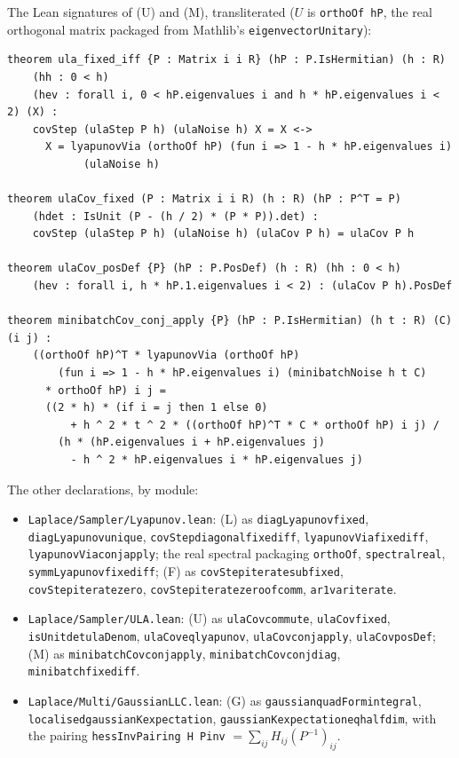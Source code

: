 \documentclass[11pt]{article}
\newcommand{\code}[1]{{\def\_{\textunderscore\allowbreak}\texttt{#1}}}
\begin{document}
\noindent The Lean signatures of (U) and (M), transliterated
($U$ is \code{orthoOf hP}, the real orthogonal matrix packaged from
Mathlib's \code{eigenvectorUnitary}):
{\small
\begin{verbatim}
theorem ula_fixed_iff {P : Matrix i i R} (hP : P.IsHermitian) (h : R)
    (hh : 0 < h)
    (hev : forall i, 0 < hP.eigenvalues i and h * hP.eigenvalues i < 2) (X) :
    covStep (ulaStep P h) (ulaNoise h) X = X <->
      X = lyapunovVia (orthoOf hP) (fun i => 1 - h * hP.eigenvalues i)
            (ulaNoise h)

theorem ulaCov_fixed (P : Matrix i i R) (h : R) (hP : P^T = P)
    (hdet : IsUnit (P - (h / 2) * (P * P)).det) :
    covStep (ulaStep P h) (ulaNoise h) (ulaCov P h) = ulaCov P h

theorem ulaCov_posDef {P} (hP : P.PosDef) (h : R) (hh : 0 < h)
    (hev : forall i, h * hP.1.eigenvalues i < 2) : (ulaCov P h).PosDef

theorem minibatchCov_conj_apply {P} (hP : P.IsHermitian) (h t : R) (C) (i j) :
    ((orthoOf hP)^T * lyapunovVia (orthoOf hP)
        (fun i => 1 - h * hP.eigenvalues i) (minibatchNoise h t C)
      * orthoOf hP) i j =
      ((2 * h) * (if i = j then 1 else 0)
          + h ^ 2 * t ^ 2 * ((orthoOf hP)^T * C * orthoOf hP) i j) /
        (h * (hP.eigenvalues i + hP.eigenvalues j)
          - h ^ 2 * hP.eigenvalues i * hP.eigenvalues j)
\end{verbatim}}
The other declarations, by module:
\begin{itemize}\raggedright
\item \code{Laplace/Sampler/Lyapunov.lean}: (L) as \code{diagLyapunov\_fixed},
\code{diagLyapunov\_unique}, \code{covStep\_diagonal\_fixed\_iff},
\code{lyapunovVia\_fixed\_iff}, \code{lyapunovVia\_conj\_apply}; the real
spectral packaging \code{orthoOf}, \code{spectral\_real},
\code{symmLyapunov\_fixed\_iff}; (F) as \code{covStep\_iterate\_sub\_fixed},
\code{covStep\_iterate\_zero}, \code{covStep\_iterate\_zero\_of\_comm},
\code{ar1\_var\_iterate}.
\item \code{Laplace/Sampler/ULA.lean}: (U) as \code{ulaCov\_commute},
\code{ulaCov\_fixed}, \code{isUnit\_det\_ulaDenom}, \code{ulaCov\_eq\_lyapunov},
\code{ulaCov\_conj\_apply}, \code{ulaCov\_posDef}; (M) as
\code{minibatchCov\_conj\_apply}, \code{minibatchCov\_conj\_diag},
\code{minibatch\_fixed\_iff}.
\item \code{Laplace/Multi/GaussianLLC.lean}: (G) as
\code{gaussian\_quadForm\_integral},
\code{localised\_gaussian\_K\_expectation},
\code{gaussian\_K\_expectation\_eq\_half\_dim}, with the pairing
\code{hessInvPairing H Pinv} $= \sum_{ij}H_{ij}(P^{-1})_{ij}$.
\end{itemize}
\end{document}
